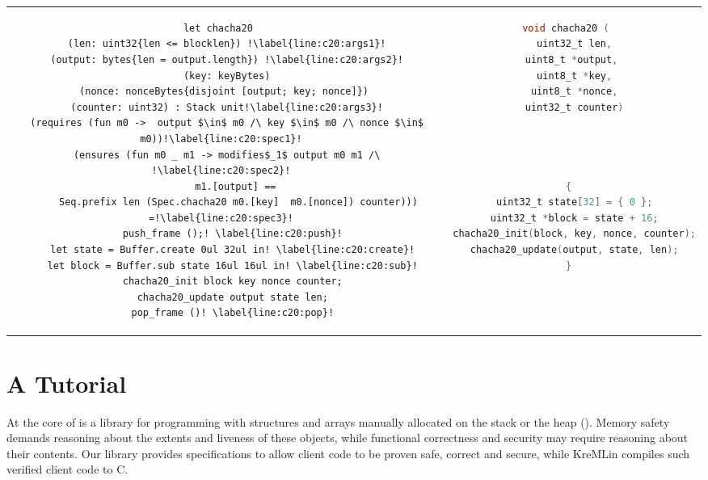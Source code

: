\begin{figure*}[t!]\small
\begin{tabular}{c|c}
\begin{lstlisting}[basicstyle=\footnotesize,language=fstar]
let chacha20 
  (len: uint32{len <= blocklen}) !\label{line:c20:args1}!
  (output: bytes{len = output.length}) !\label{line:c20:args2}!
  (key: keyBytes)
  (nonce: nonceBytes{disjoint [output; key; nonce]}) 
  (counter: uint32) : Stack unit!\label{line:c20:args3}!
  (requires (fun m0 ->  output $\in$ m0 /\ key $\in$ m0 /\ nonce $\in$ m0))!\label{line:c20:spec1}!
  (ensures (fun m0 _ m1 -> modifies$_1$ output m0 m1 /\ !\label{line:c20:spec2}!
      m1.[output] == 
      Seq.prefix len (Spec.chacha20 m0.[key]  m0.[nonce]) counter))) =!\label{line:c20:spec3}!
    push_frame ();! \label{line:c20:push}!
    let state = Buffer.create 0ul 32ul in! \label{line:c20:create}!
    let block = Buffer.sub state 16ul 16ul in! \label{line:c20:sub}!
    chacha20_init block key nonce counter;
    chacha20_update output state len;
    pop_frame ()! \label{line:c20:pop}!
\end{lstlisting}
&\quad
\;\;
\begin{lstlisting}[basicstyle=\footnotesize,language=C]
void chacha20 ( 
  uint32_t len,
  uint8_t *output, 
  uint8_t *key,
  uint8_t *nonce,
  uint32_t counter)




{
  uint32_t state[32] = { 0 };
  uint32_t *block = state + 16;
  chacha20_init(block, key, nonce, counter);
  chacha20_update(output, state, len);
}
\end{lstlisting}
\end{tabular}
\caption{A snippet from ChaCha20 in \lowstar (left) and its C compilation
(right)}
\label{fig:chacha20-both}
\end{figure*}
\section{A \lowstar Tutorial}
\label{sec:examples}

At the core of \lowstar is a library for programming with
structures and arrays manually allocated on the stack or the heap ().
Memory safety demands reasoning about the extents and
liveness of these objects, while functional correctness and security
may require reasoning about their contents. Our library
provides %
specifications to allow client code to be
proven safe, correct and secure,
while KreMLin compiles such verified client code to C.

